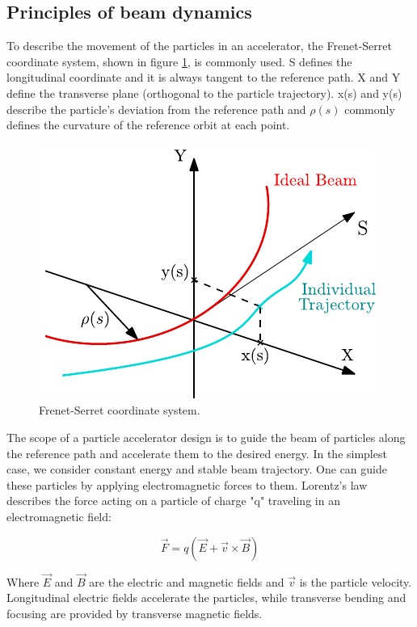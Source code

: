 \subsection{Principles of beam dynamics}
\label{subsec:PrincBeamDyn}

To describe the movement of the particles in an accelerator, the Frenet-Serret coordinate system, shown in figure \ref{fig:CoordinateSystem}, is commonly used. S defines the longitudinal coordinate and it is always tangent to the reference path. X and Y define the transverse plane (orthogonal to the particle trajectory). x(s) and y(s) describe the particle's deviation from the reference path and $\rho(s)$ commonly defines the curvature of the reference orbit at each point. 


\begin{figure}[h]
    \centering
    \includegraphics[width=0.5\columnwidth]{Figure_CoordinateSystem/CoordinateSystem.pdf}
    \caption{Frenet-Serret coordinate system.}
    \label{fig:CoordinateSystem}
\end{figure}

The scope of a particle accelerator design is to guide the beam of particles along the reference path and accelerate them to the desired energy. In the simplest case, we consider constant energy and stable beam trajectory. One can guide these particles by applying electromagnetic forces to them. Lorentz's law describes the force acting on a particle of charge "q" traveling in an electromagnetic field:

\begin{equation}
    \vec{F} = q \left( \vec{E} + \vec{v} \times  \vec{B}\right)
    \label{eq:LorentzLaw}
\end{equation}

Where $\vec{E}$ and $\vec{B}$ are the electric and magnetic fields and $\vec{v}$ is the particle velocity. Longitudinal electric fields accelerate the particles, while transverse bending and focusing are provided by transverse magnetic fields. 

